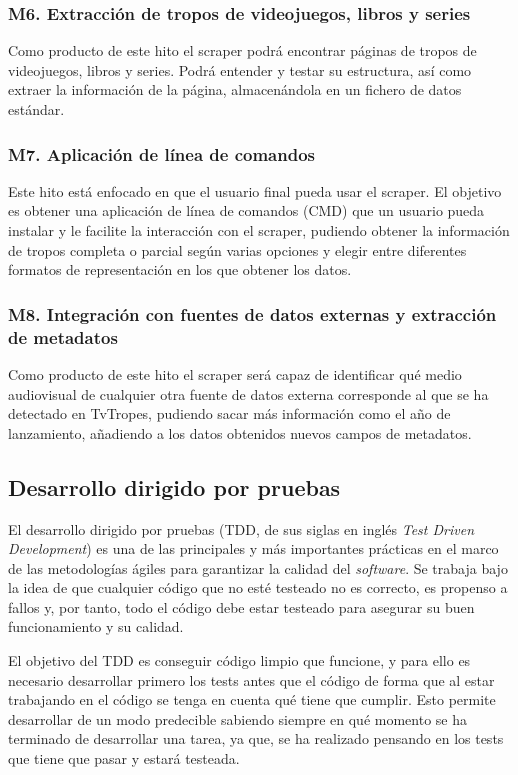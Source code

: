\subsubsection{M6. Extracción de tropos de videojuegos, libros y series}
Como producto de este hito el scraper podrá encontrar páginas de tropos de
videojuegos, libros y series. Podrá entender y testar su estructura, así como
extraer la información de la página, almacenándola en un fichero de datos
estándar.

\subsubsection{M7. Aplicación de línea de comandos}
Este hito está enfocado en que el usuario final pueda usar el scraper. El
objetivo es obtener una aplicación de línea de comandos (CMD) que un usuario
pueda instalar y le facilite la interacción con el scraper, pudiendo obtener la
información de tropos completa o parcial según varias opciones y elegir entre
diferentes formatos de representación en los que obtener los datos.

\subsubsection{M8. Integración con fuentes de datos externas y extracción de metadatos}
Como producto de este hito el scraper será capaz de identificar qué medio
audiovisual de cualquier otra fuente de datos externa corresponde al que se ha
detectado en TvTropes, pudiendo sacar más información como el año de
lanzamiento, añadiendo a los datos obtenidos nuevos campos de metadatos.

\subsection{Desarrollo dirigido por pruebas}
El desarrollo dirigido por pruebas (TDD, de sus siglas en inglés \textit{Test
Driven Development}) es una de las principales y más importantes prácticas en el
marco de las metodologías ágiles para garantizar la calidad del
\textit{software}. Se trabaja bajo la idea de que cualquier código que no esté
testeado no es correcto, es propenso a fallos y, por tanto, todo el código debe
estar testeado para asegurar su buen funcionamiento y su calidad.

El objetivo del TDD es conseguir código limpio que funcione, y para ello es
necesario desarrollar primero los tests antes que el código de forma que al
estar trabajando en el código se tenga en cuenta qué tiene que cumplir. Esto
permite desarrollar de un modo predecible sabiendo siempre en qué momento se ha
terminado de desarrollar una tarea, ya que, se ha realizado pensando en los
tests que tiene que pasar y estará testeada. 

